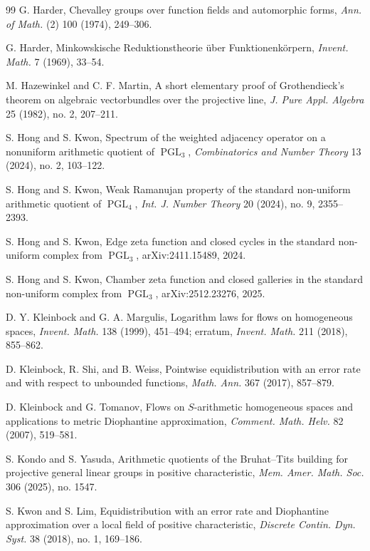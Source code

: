 \documentclass[11pt]{amsart}
\newcommand{\PGL}{\operatorname{PGL}}
\theoremstyle{plain}
\theoremstyle{definition}
\numberwithin{equation}{section}
\begin{document}
\begin{thebibliography}{99}
G. Harder,
Chevalley groups over function fields and automorphic forms,
\emph{Ann. of Math.} (2) 100 (1974), 249--306.

G. Harder,
Minkowskische Reduktionstheorie \"uber Funktionenk\"orpern,
\emph{Invent. Math.} 7 (1969), 33--54.

M. Hazewinkel and C. F. Martin,
A short elementary proof of Grothendieck's theorem on algebraic vectorbundles over the
projective line,
\emph{J. Pure Appl. Algebra} 25 (1982), no. 2, 207--211.

S. Hong and S. Kwon,
Spectrum of the weighted adjacency operator on a nonuniform arithmetic quotient of
\(\PGL_3\),
\emph{Combinatorics and Number Theory} 13 (2024), no. 2, 103--122.

S. Hong and S. Kwon,
Weak Ramanujan property of the standard non-uniform arithmetic quotient of \(\PGL_4\),
\emph{Int. J. Number Theory} 20 (2024), no. 9, 2355--2393.

S. Hong and S. Kwon,
Edge zeta function and closed cycles in the standard non-uniform complex from
\(\PGL_3\),
arXiv:2411.15489, 2024.

S. Hong and S. Kwon,
Chamber zeta function and closed galleries in the standard non-uniform complex from
\(\PGL_3\),
arXiv:2512.23276, 2025.

D. Y. Kleinbock and G. A. Margulis,
Logarithm laws for flows on homogeneous spaces,
\emph{Invent. Math.} 138 (1999), 451--494; erratum, \emph{Invent. Math.} 211 (2018),
855--862.

D. Kleinbock, R. Shi, and B. Weiss,
Pointwise equidistribution with an error rate and with respect to unbounded functions,
\emph{Math. Ann.} 367 (2017), 857--879.

D. Kleinbock and G. Tomanov,
Flows on $S$-arithmetic homogeneous spaces and applications to metric Diophantine
approximation,
\emph{Comment. Math. Helv.} 82 (2007), 519--581.

S. Kondo and S. Yasuda,
Arithmetic quotients of the Bruhat--Tits building for projective general linear groups in
positive characteristic,
\emph{Mem. Amer. Math. Soc.} 306 (2025), no. 1547.

S. Kwon and S. Lim,
Equidistribution with an error rate and Diophantine approximation over a local field of
positive characteristic,
\emph{Discrete Contin. Dyn. Syst.} 38 (2018), no. 1, 169--186.


\end{thebibliography}
\end{document}
